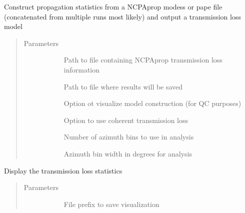\documentclass[letterpaper,10pt,english]{sphinxmanual}
\begin{document}
\begin{fulllineitems}
\begin{fulllineitems}
\label{\detokenize{stochprop.propagation:stochprop.propagation.TLossModel.build}}
Construct propagation statistics from a NCPAprop modess or pape file (concatenated from
multiple runs most likely) and output a transmission loss model
\begin{quote}\begin{description}
\item[{Parameters}] \leavevmode\begin{description}
\item[{}] \leavevmode
Path to file containing NCPAprop transmission loss information

\item[{}] \leavevmode
Path to file where results will be saved

\item[{}] \leavevmode
Option ot visualize model construction (for QC purposes)

\item[{}] \leavevmode
Option to use coherent transmission loss

\item[{}] \leavevmode
Number of azimuth bins to use in analysis

\item[{}] \leavevmode
Azimuth bin width in degrees for analysis

\end{description}

\end{description}\end{quote}

\end{fulllineitems}


\begin{fulllineitems}
\label{\detokenize{stochprop.propagation:stochprop.propagation.TLossModel.display}}
Display the transmission loss statistics
\begin{quote}\begin{description}
\item[{Parameters}] \leavevmode\begin{description}
\item[{}] \leavevmode
File prefix to save visualization


\end{description}
\end{description}
\end{quote}
\end{fulllineitems}
\end{fulllineitems}
\end{document}
